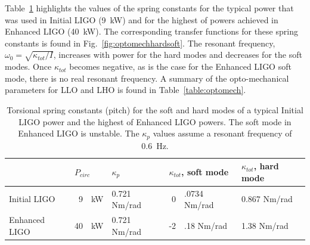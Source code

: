 Table~\ref{table:k_tot} highlights the values of the spring constants
for the typical power that was used in Initial LIGO (9~kW) and for the
highest of powers achieved in Enhanced LIGO (40~kW). The corresponding
transfer functions for these spring constants is found in
Fig.~\ref{fig:optomechhardsoft}. The resonant frequency, $\omega_0 =
\sqrt{\kappa_{tot}/I}$, increases with power for the hard modes and
decreases for the soft modes. Once $\kappa_{tot}$ becomes negative, as
is the case for the Enhanced LIGO soft mode, there is no real resonant
frequency. A summary of the opto-mechanical parameters for LLO and LHO
is found in Table~\ref{table:optomech}.

\begin{table}
\centering
\caption[Torsional spring constants for the soft and hard cavity
modes]{Torsional spring constants (pitch) for the soft and hard modes
  of a typical Initial LIGO power and the highest of Enhanced LIGO
  powers. The soft mode in Enhanced LIGO is unstable. The $\kappa_p$
  values assume a resonant frequency of 0.6~Hz.}
\begin{tabular}{l r@{ }l l r@{}l l}
\hline
 & \multicolumn{2}{l}{$P_{circ}$} & $\kappa_{p}$ & \multicolumn{2}{l}{$\kappa_{tot}$, soft mode} &
 $\kappa_{tot}$, hard mode\\
\hline
Initial LIGO & 9& kW & 0.721 Nm/rad& 0&.0734 Nm/rad & 0.867 Nm/rad\\
Enhanced LIGO & 40& kW & 0.721 Nm/rad& -2&.18 Nm/rad & 1.38 Nm/rad\\
\hline
\end{tabular}
\label{table:k_tot}
\end{table}

